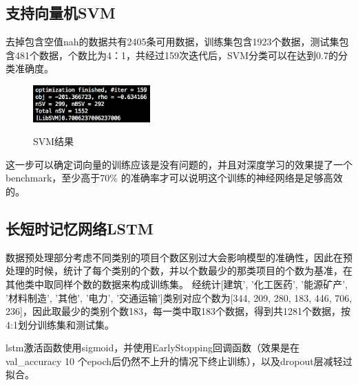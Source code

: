 \documentclass[UTF8]{ctexart}
\begin{document}
\subsection{支持向量机SVM}
去掉包含空值nah的数据共有2405条可用数据，训练集包含1923个数据，测试集包含481个数据，个数比为4：1，共经过159次迭代后，SVM分类可以在达到0.7的分类准确度。
\begin{figure}[H]
  \centering
  \label{fig:Per6A}\includegraphics[width=0.4\textwidth]{svm.png}\
  \caption{SVM结果}
  \label{fig:oscil}
\end{figure}
这一步可以确定词向量的训练应该是没有问题的，并且对深度学习的效果提了一个benchmark，至少高于70\% 的准确率才可以说明这个训练的神经网络是足够高效的。

\subsection{长短时记忆网络LSTM}
数据预处理部分考虑不同类别的项目个数区别过大会影响模型的准确性，因此在预处理的时候，统计了每个类别的个数，并以个数最少的那类项目的个数为基准，在其他类中取同样个数的数据来构成训练集。
经统计[建筑', '化工医药', '能源矿产', '材料制造', '其他', '电力', '交通运输']类别对应个数为[344, 209, 280, 183, 446, 706, 236]，因此取最少的类别个数183，每一类中取183个数据，得到共1281个数据，按4:1划分训练集和测试集。

lstm激活函数使用sigmoid，并使用EarlyStopping回调函数（效果是在val\_accuracy 10 个epoch后仍然不上升的情况下终止训练），以及dropout层减轻过拟合。
\end{document}
